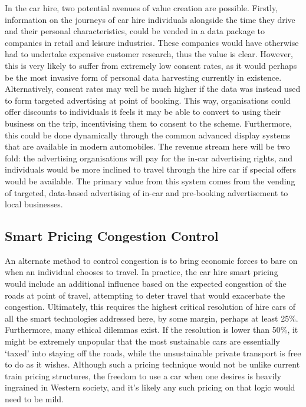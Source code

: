 \documentclass[journal]{IEEEtran}
\begin{document}
In the car hire, two potential avenues of value creation are possible.
Firstly, information on the journeys of car hire individuals alongside
the time they drive and their personal characteristics, could be
vended in a data package to companies in retail and leisure
industries. These companies would have otherwise had to undertake
expensive customer research, thus the value is clear. However, this is
very likely to suffer from extremely low consent rates, as it would
perhaps be the most invasive form of personal data harvesting
currently in existence. Alternatively, consent rates may well be much
higher if the data was instead used to form targeted advertising at
point of booking. This way, organisations could offer discounts to
individuals it feels it may be able to convert to using their business
on the trip, incentivising them to consent to the scheme. Furthermore,
this could be done dynamically through the common advanced display
systems that are available in modern automobiles. The revenue stream
here will be two fold: the advertising organisations will pay for the
in-car advertising rights, and individuals would be more inclined to
travel through the hire car if special offers would be available.  The
primary value from this system comes from the vending of targeted,
data-based advertising of in-car and pre-booking advertisement to
local businesses.


\subsection{Smart Pricing Congestion Control}

An alternate method to control congestion is to bring economic forces
to bare on when an individual chooses to travel. In practice, the car
hire smart pricing would include an additional influence based on the
expected congestion of the roads at point of travel, attempting to
deter travel that would exacerbate the congestion.  Ultimately, this
requires the highest critical resolution of hire cars of all the smart
technologies addressed here, by some margin, perhaps at least
25\%. Furthermore, many ethical dilemmas exist. If the resolution is
lower than 50\%, it might be extremely unpopular that the most
sustainable cars are essentially `taxed' into staying off the roads,
while the unsustainable private transport is free to do as it
wishes. Although such a pricing technique would not be unlike current
train pricing structures, the freedom to use a car when one desires is
heavily ingrained in Western society, and it's likely any such pricing
on that logic would need to be mild.
\end{document}
